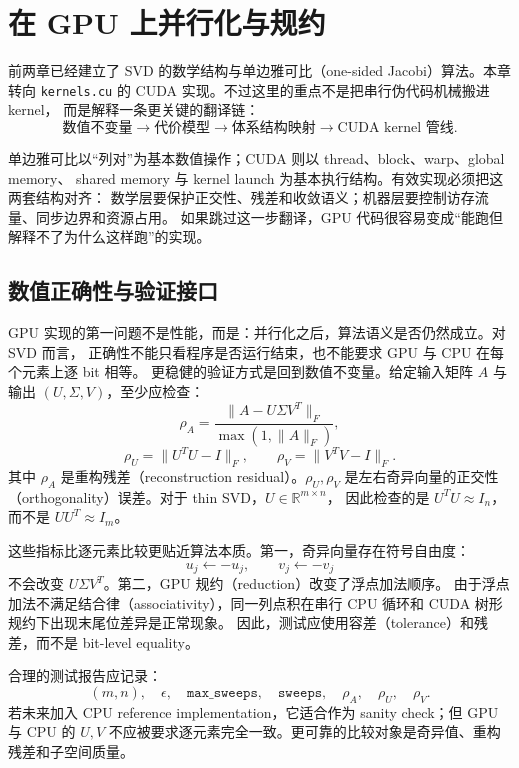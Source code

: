 \section{在 GPU 上并行化与规约}

前两章已经建立了 SVD 的数学结构与单边雅可比（one-sided Jacobi）算法。本章转向
\texttt{kernels.cu} 的 CUDA 实现。不过这里的重点不是把串行伪代码机械搬进 kernel，
而是解释一条更关键的翻译链：
\[
    \text{数值不变量}
    \longrightarrow
    \text{代价模型}
    \longrightarrow
    \text{体系结构映射}
    \longrightarrow
    \text{CUDA kernel 管线}.
\]

单边雅可比以“列对”为基本数值操作；CUDA 则以 thread、block、warp、global memory、
shared memory 与 kernel launch 为基本执行结构。有效实现必须把这两套结构对齐：
数学层要保护正交性、残差和收敛语义；机器层要控制访存流量、同步边界和资源占用。
如果跳过这一步翻译，GPU 代码很容易变成“能跑但解释不了为什么这样跑”的实现。

\subsection{数值正确性与验证接口}

GPU 实现的第一问题不是性能，而是：并行化之后，算法语义是否仍然成立。对 SVD 而言，
正确性不能只看程序是否运行结束，也不能要求 GPU 与 CPU 在每个元素上逐 bit 相等。
更稳健的验证方式是回到数值不变量。给定输入矩阵 \(A\) 与输出 \((U,\Sigma,V)\)，至少应检查：
\[
    \rho_A =
    \frac{\lVert A-U\Sigma V^T\rVert_F}{\max(1,\lVert A\rVert_F)},
\]
\[
    \rho_U =
    \lVert U^TU-I\rVert_F,
    \qquad
    \rho_V =
    \lVert V^TV-I\rVert_F.
\]
其中 \(\rho_A\) 是重构残差（reconstruction residual）。\(\rho_U,\rho_V\) 是左右奇异向量的正交性
（orthogonality）误差。对于 thin SVD，\(U\in\mathbb{R}^{m\times n}\)，
因此检查的是 \(U^TU\approx I_n\)，而不是 \(UU^T\approx I_m\)。

这些指标比逐元素比较更贴近算法本质。第一，奇异向量存在符号自由度：
\[
    u_j\leftarrow -u_j,\qquad v_j\leftarrow -v_j
\]
不会改变 \(U\Sigma V^T\)。第二，GPU 规约（reduction）改变了浮点加法顺序。
由于浮点加法不满足结合律（associativity），同一列点积在串行 CPU 循环和 CUDA 树形规约下出现末尾位差异是正常现象。
因此，测试应使用容差（tolerance）和残差，而不是 bit-level equality。

合理的测试报告应记录：
\[
    (m,n),\quad \epsilon,\quad \texttt{max\_sweeps},\quad
    \texttt{sweeps},\quad \rho_A,\quad \rho_U,\quad \rho_V.
\]
若未来加入 CPU reference implementation，它适合作为 sanity check；但 GPU 与 CPU 的
\(U,V\) 不应被要求逐元素完全一致。更可靠的比较对象是奇异值、重构残差和子空间质量。

